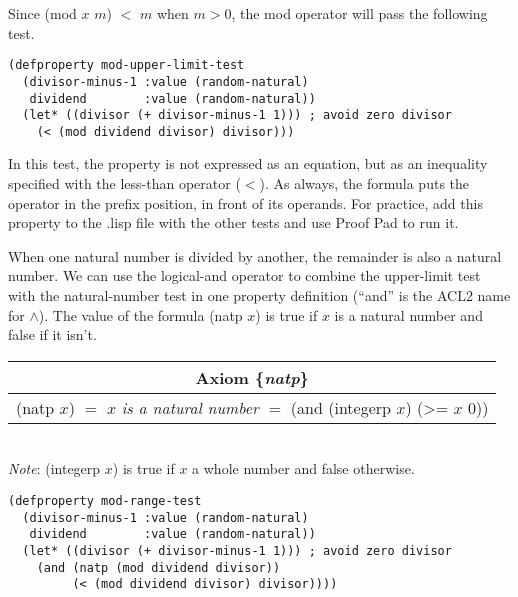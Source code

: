 Since (\textsf{mod} $x$ $m$) $<$ $m$ when $m > 0$,
the \textsf{mod} operator will pass the following test.

\begin{code}
\begin{verbatim}
(defproperty mod-upper-limit-test
  (divisor-minus-1 :value (random-natural)
   dividend        :value (random-natural))
  (let* ((divisor (+ divisor-minus-1 1))) ; avoid zero divisor
    (< (mod dividend divisor) divisor)))
\end{verbatim}
\end{code}

In this test, the property is not expressed as an equation,
but as an inequality
specified with the less-than operator ($<$).
As always, the formula puts the operator in the prefix position,
in front of its operands.
For practice, add this property to the .lisp file with the other tests and
use Proof Pad to run it.

When one natural number is divided by another,
the remainder is also a natural number.
We can use the logical-and operator
to combine the upper-limit test with the natural-number test
in one property definition
(``\textsf{and}'' is the ACL2 name for $\wedge$).
\label{natp-op}The value of the formula
\textsf{(natp $x$)} is true
if $x$ is a natural number and false if it isn't.

\label{natp-axiom-formal}
\begin{center}
\begin{tabular}{c}
Axiom \{\emph{natp}\} \\
\hline
(natp $x$) $=$ $x$ \emph{is a natural number} $=$ \textsf{(and (integerp $x$) (>= $x$ 0))}\\
\end{tabular}\\
\emph{Note}: \textsf{(integerp $x$)} is true if $x$ a whole number and false otherwise.
\end{center}

\begin{code}
\begin{verbatim}
(defproperty mod-range-test
  (divisor-minus-1 :value (random-natural)
   dividend        :value (random-natural))
  (let* ((divisor (+ divisor-minus-1 1))) ; avoid zero divisor
    (and (natp (mod dividend divisor))
         (< (mod dividend divisor) divisor))))
\end{verbatim}
\end{code}

